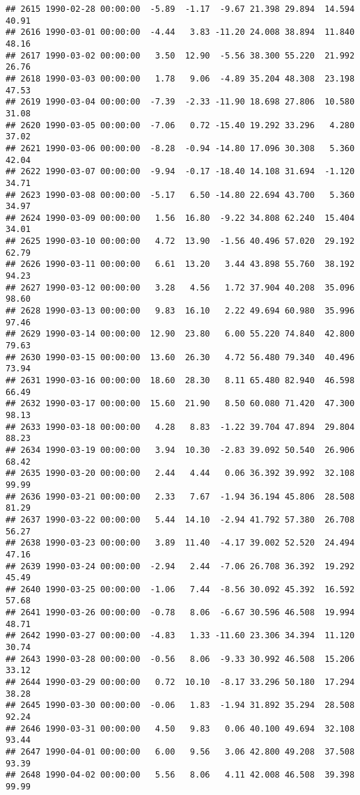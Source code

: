 \documentclass{article}\usepackage{graphicx, color}
\makeatletter
\newenvironment{kframe}{%
 \def\at@end@of@kframe{}%
 \ifinner\ifhmode%
  \def\at@end@of@kframe{\end{minipage}}%
  \begin{minipage}{\columnwidth}%
 \fi\fi%
 \def\FrameCommand##1{\hskip\@totalleftmargin \hskip-\fboxsep
 \colorbox{shadecolor}{##1}\hskip-\fboxsep
     \hskip-\linewidth \hskip-\@totalleftmargin \hskip\columnwidth}%
 \MakeFramed {\advance\hsize-\width
   \@totalleftmargin\z@ \linewidth\hsize
   \@setminipage}}%
 {\par\unskip\endMakeFramed%
 \at@end@of@kframe}
\newenvironment{knitrout}{}{} %
\makeatother
\begin{document}
\begin{knitrout}
\begin{kframe}
\begin{verbatim}
## 2615 1990-02-28 00:00:00  -5.89  -1.17  -9.67 21.398 29.894  14.594  40.91
## 2616 1990-03-01 00:00:00  -4.44   3.83 -11.20 24.008 38.894  11.840  48.16
## 2617 1990-03-02 00:00:00   3.50  12.90  -5.56 38.300 55.220  21.992  26.76
## 2618 1990-03-03 00:00:00   1.78   9.06  -4.89 35.204 48.308  23.198  47.53
## 2619 1990-03-04 00:00:00  -7.39  -2.33 -11.90 18.698 27.806  10.580  31.08
## 2620 1990-03-05 00:00:00  -7.06   0.72 -15.40 19.292 33.296   4.280  37.02
## 2621 1990-03-06 00:00:00  -8.28  -0.94 -14.80 17.096 30.308   5.360  42.04
## 2622 1990-03-07 00:00:00  -9.94  -0.17 -18.40 14.108 31.694  -1.120  34.71
## 2623 1990-03-08 00:00:00  -5.17   6.50 -14.80 22.694 43.700   5.360  34.97
## 2624 1990-03-09 00:00:00   1.56  16.80  -9.22 34.808 62.240  15.404  34.01
## 2625 1990-03-10 00:00:00   4.72  13.90  -1.56 40.496 57.020  29.192  62.79
## 2626 1990-03-11 00:00:00   6.61  13.20   3.44 43.898 55.760  38.192  94.23
## 2627 1990-03-12 00:00:00   3.28   4.56   1.72 37.904 40.208  35.096  98.60
## 2628 1990-03-13 00:00:00   9.83  16.10   2.22 49.694 60.980  35.996  97.46
## 2629 1990-03-14 00:00:00  12.90  23.80   6.00 55.220 74.840  42.800  79.63
## 2630 1990-03-15 00:00:00  13.60  26.30   4.72 56.480 79.340  40.496  73.94
## 2631 1990-03-16 00:00:00  18.60  28.30   8.11 65.480 82.940  46.598  66.49
## 2632 1990-03-17 00:00:00  15.60  21.90   8.50 60.080 71.420  47.300  98.13
## 2633 1990-03-18 00:00:00   4.28   8.83  -1.22 39.704 47.894  29.804  88.23
## 2634 1990-03-19 00:00:00   3.94  10.30  -2.83 39.092 50.540  26.906  68.42
## 2635 1990-03-20 00:00:00   2.44   4.44   0.06 36.392 39.992  32.108  99.99
## 2636 1990-03-21 00:00:00   2.33   7.67  -1.94 36.194 45.806  28.508  81.29
## 2637 1990-03-22 00:00:00   5.44  14.10  -2.94 41.792 57.380  26.708  56.27
## 2638 1990-03-23 00:00:00   3.89  11.40  -4.17 39.002 52.520  24.494  47.16
## 2639 1990-03-24 00:00:00  -2.94   2.44  -7.06 26.708 36.392  19.292  45.49
## 2640 1990-03-25 00:00:00  -1.06   7.44  -8.56 30.092 45.392  16.592  57.68
## 2641 1990-03-26 00:00:00  -0.78   8.06  -6.67 30.596 46.508  19.994  48.71
## 2642 1990-03-27 00:00:00  -4.83   1.33 -11.60 23.306 34.394  11.120  30.74
## 2643 1990-03-28 00:00:00  -0.56   8.06  -9.33 30.992 46.508  15.206  33.12
## 2644 1990-03-29 00:00:00   0.72  10.10  -8.17 33.296 50.180  17.294  38.28
## 2645 1990-03-30 00:00:00  -0.06   1.83  -1.94 31.892 35.294  28.508  92.24
## 2646 1990-03-31 00:00:00   4.50   9.83   0.06 40.100 49.694  32.108  93.44
## 2647 1990-04-01 00:00:00   6.00   9.56   3.06 42.800 49.208  37.508  93.39
## 2648 1990-04-02 00:00:00   5.56   8.06   4.11 42.008 46.508  39.398  99.99

\end{verbatim}
\end{kframe}
\end{knitrout}
\end{document}
